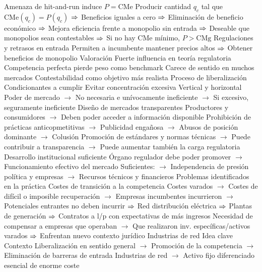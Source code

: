 \documentclass{nuevotema}
\begin{document}
\begin{esquemal}
				\4 Amenaza de hit-and-run induce $P=\text{CMe}$
				\4[] Producir cantidad $q_c$ tal que $\text{CMe}(q_c) = P(q_c)$
				\4[] $\Rightarrow$ Beneficios iguales a cero
				\4[] $\Rightarrow$ Eliminación de beneficio económico
				\4[] $\Rightarrow$ Mejora eficiencia frente a monopolio sin entrada
				\4[] $\Rightarrow$ Deseable que monopolios sean contestables
				\4[] $\Rightarrow$ Si no hay CMe mínimo, $P>\text{CMg}$
				\4 Regulaciones y retrasos en entrada
				\4[] Permiten a incumbente mantener precios altos
				\4[] $\Rightarrow$ Obtener beneficios de monopolio
			\3 Valoración
				\4 Fuerte influencia en teoría regulatoria
				\4 Competencia perfecta pierde peso como benchmark
				\4[] Carece de sentido en muchos mercados
				\4 Contestabilidad como objetivo más realista
		\2 Proceso de liberalización
			\3 Condicionantes a cumplir
				\4 Evitar concentración excesiva
				\4[] Vertical y horizontal
				\4[] Poder de mercado
				\4[] $\to$ No necesaria e unívocamente ineficiente
				\4[] $\to$ Si excesivo, seguramente ineficiente
				\4 Diseño de mercados transparentes
				\4[] Productores y consumidores
				\4[] $\to$ Deben poder acceder a información disponible
				\4[] Prohibición de prácticas anticopmetitivas
				\4[] $\to$ Publicidad engañosa
				\4[] $\to$ Abusos de posición dominante
				\4[] $\to$ Colusión
				\4[] Promoción de estándares y normas técnicas
				\4[] $\to$ Puede contribuir a transparencia
				\4[] $\to$ Puede aumentar también la carga regulatoria
				\4 Desarrollo institucional suficiente
				\4[] Órgano regulador debe poder promover
				\4[] $\to$ Funcionamiento efectivo del mercado
				\4[] Suficientes:
				\4[] $\to$ Independencia de presión política y empresas
				\4[] $\to$ Recursos técnicos y financieros
			\3 Problemas identificados en la práctica
				\4 Costes de transición a la competencia
				\4[] Costes varados
				\4[] $\to$ Costes de difícil o imposible recuperación
				\4[] $\to$ Empresas incumbentes incurrieron
				\4[] $\to$ Potenciales entrantes no deben incurrir
				\4[] $\Rightarrow$ Red distribución eléctrica
				\4[] $\Rightarrow$ Plantas de generación
				\4[] $\Rightarrow$ Contratos a l/p con expectativas de más ingresos
				\4[] Necesidad de compensar a empresas que operaban
				\4[] $\to$ Que realizaron inv. específicas/activos varados
				\4[] $\Rightarrow$ Enfrentan nuevo contexto jurídico
		\2 Industrias de red
			\3 Idea clave
				\4 Contexto
				\4[] Liberalización en sentido general
				\4[] $\to$ Promoción de la competencia
				\4[] $\to$ Eliminación de barreras de entrada
				\4[] Industrias de red
				\4[] $\to$ Activo fijo diferenciado esencial de enorme coste

\end{esquemal}
\end{document}
